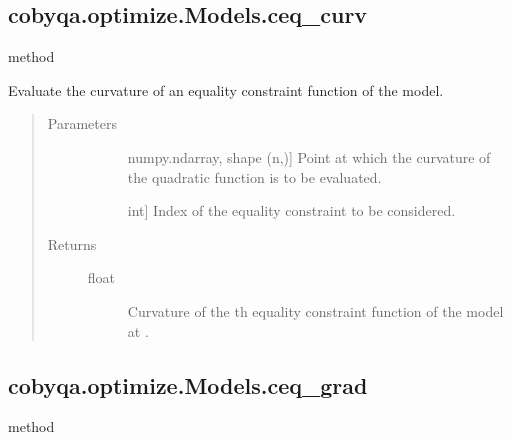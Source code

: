 \documentclass[letterpaper,10pt,english]{sphinxmanual}
\begin{document}
\begin{fulllineitems}
\subsection{cobyqa.optimize.Models.ceq\_curv}
\label{\detokenize{refs/generated/cobyqa.optimize.Models.ceq_curv:cobyqa-optimize-models-ceq-curv}}\label{\detokenize{refs/generated/cobyqa.optimize.Models.ceq_curv::doc}}
\sphinxAtStartPar
method

\begin{fulllineitems}
\label{\detokenize{refs/generated/cobyqa.optimize.Models.ceq_curv:cobyqa.optimize.Models.ceq_curv}}
\sphinxAtStartPar
Evaluate the curvature of an equality constraint function of the model.
\begin{quote}\begin{description}
\item[{Parameters}] \leavevmode\begin{description}
\item[{}] \leavevmode{[}numpy.ndarray, shape (n,){]}
\sphinxAtStartPar
Point at which the curvature of the quadratic function is to be
evaluated.

\item[{}] \leavevmode{[}int{]}
\sphinxAtStartPar
Index of the equality constraint to be considered.

\end{description}

\item[{Returns}] \leavevmode\begin{description}
\item[{float}] \leavevmode
\sphinxAtStartPar
Curvature of the \sphinxhyphen{}th equality constraint function of the model at
.

\end{description}

\end{description}\end{quote}

\end{fulllineitems}



\subsection{cobyqa.optimize.Models.ceq\_grad}
\label{\detokenize{refs/generated/cobyqa.optimize.Models.ceq_grad:cobyqa-optimize-models-ceq-grad}}\label{\detokenize{refs/generated/cobyqa.optimize.Models.ceq_grad::doc}}
\sphinxAtStartPar
method


\end{fulllineitems}
\end{document}

